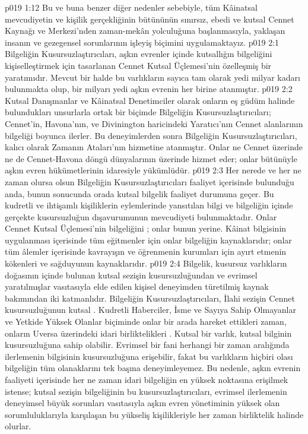 \vs p019 1:12 Bu ve buna benzer diğer nedenler sebebiyle, tüm Kâinatsal mevcudiyetin ve kişilik gerçekliğinin bütününün sınırsız, ebedi ve kutsal Cennet Kaynağı ve Merkezi’nden zaman\hyp{}mekân yolculuğuna başlanmasıyla, yaklaşan insanın ve gezegensel sorunlarının işleyiş biçimini uygulamaktayız.
\vs p019 2:1 Bilgeliğin Kusursuzlaştırıcıları, aşkın evrenler içinde kutsallığın bilgeliğini kişiselleştirmek için tasarlanan Cennet Kutsal Üçlemesi’nin özelleşmiş bir yaratımıdır. Mevcut bir halde bu varlıkların sayıca tam olarak yedi milyar kadarı bulunmakta olup, bir milyarı yedi aşkın evrenin her birine atanmıştır.
\vs p019 2:2 Kutsal Danışmanlar ve Kâinatsal Denetimciler olarak onların eş güdüm halinde bulundukları unsurlarla ortak bir biçimde Bilgeliğin Kusursuzlaştırıcıları; Cennet’in, Havona’nın, ve Divinington haricindeki Yaratıcı’nın Cennet alanlarının bilgeliği boyunca ilerler. Bu deneyimlerden sonra Bilgeliğin Kusursuzlaştırıcıları, kalıcı olarak Zamanın Ataları’nın hizmetine atanmıştır. Onlar ne Cennet üzerinde ne de Cennet\hyp{}Havona döngü dünyalarının üzerinde hizmet eder; onlar bütünüyle aşkın evren hükümetlerinin idaresiyle yükümlüdür.
\vs p019 2:3 Her nerede ve her ne zaman olursa olsun Bilgeliğin Kusursuzlaştırıcıları faaliyet içerisinde bulunduğu anda, bunun sonucunda orada kutsal bilgelik faaliyet durumuna geçer. Bu kudretli ve ihtişamlı kişiliklerin eylemlerinde yansıtılan bilgi ve bilgeliğin içinde gerçekte kusursuzluğun dışavurumunun mevcudiyeti bulunmaktadır. Onlar Cennet Kutsal Üçlemesi’nin bilgeliğini ; onlar bunun yerine. Kâinat bilgisinin uygulanması içerisinde tüm eğitmenler için onlar bilgeliğin kaynaklarıdır; onlar tüm âlemler içerisinde kavrayışın ve öğrenmenin kurumları için ayırt etmenin kökenleri ve sağduyunun kaynaklarıdır.
\vs p019 2:4 Bilgelik, kusursuz varlıkların doğasının içinde bulunan kutsal sezişin kusursuzluğundan ve evrimsel yaratılmışlar vasıtasıyla elde edilen kişisel deneyimden türetilmiş kaynak bakımından iki katmanlıdır. Bilgeliğin Kusursuzlaştırıcıları, İlahi sezişin Cennet kusursuzluğunun kutsal . Kudretli Haberciler, İsme ve Sayıya Sahip Olmayanlar ve Yetkide Yüksek Olanlar biçiminde onlar bir arada hareket ettikleri zaman, onların Uversa üzerindeki idari birliktelikleri . Kutsal bir varlık, kutsal bilginin kusursuzluğuna sahip olabilir. Evrimsel bir fani herhangi bir zaman aralığında ilerlemenin bilgisinin kusursuzluğuna erişebilir, fakat bu varlıkların hiçbiri olası bilgeliğin tüm olanaklarını tek başına deneyimleyemez. Bu nedenle, aşkın evrenin faaliyeti içerisinde her ne zaman idari bilgeliğin en yüksek noktasına erişilmek istense; kutsal sezişin bilgeliğinin bu kusursuzlaştırıcıları, evrimsel ilerlemenin deneyimsel büyük sorunları vasıtasıyla aşkın evren yönetiminin yüksek olan sorumluluklarıyla karşılaşan bu yükseliş kişilikleriyle her zaman birliktelik halinde olurlar.
